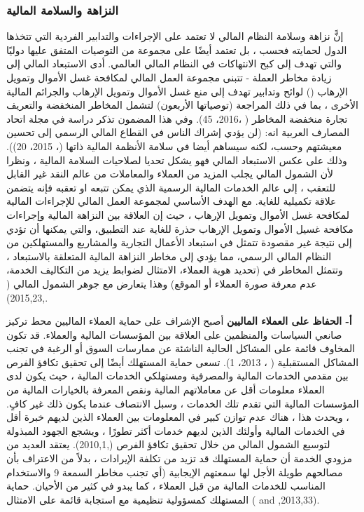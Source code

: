 \documentclass[10pt,a4paper]{report}
\begin{document}
\begin{doublespacing}
\subsubsection{النزاهة والسلامة المالية}
إنًّ نزاهة وسلامة النظام المالي لا تعتمد على الإجراءات والتدابير الفردية التي تتخذها الدول لحمايته فحسب ، بل تعتمد أيضًا على مجموعة من التوصيات المتفق عليها دوليًا والتي تهدف إلى كبح الانتهاكات في النظام المالي العالمي. أدى الاستبعاد المالي إلى زيادة مخاطر العملة - تتبنى مجموعة العمل المالي لمكافحة غسل الأموال وتمويل الإرهاب () لوائح وتدابير تهدف إلى منع غسل الأموال وتمويل الإرهاب والجرائم المالية الأخرى ، بما في ذلك المراجعة (توصياتها الأربعون) لتشمل المخاطر المنخفضة والتعريف تجارة منخفضة المخاطر ( ،2016، 45). 
وفي هذا المضمون تذكر دراسة في مجلة اتحاد المصارف العربية انه: (لن يؤدي إشراك الناس في القطاع المالي الرسمي إلى تحسين معيشتهم وحسب، لكنه سيساهم أيضا في سلامة الأنظمة المالية ذاتها (، 2015، 20)). وذلك على عكس الاستبعاد المالي فهو يشكل تحديا لصلاحيات السلامة المالية ، ونظرا لأن الشمول المالي يجلب المزيد من العملاء والمعاملات من عالم النقد غير القابل للتعقب ، إلى عالم الخدمات المالية الرسمية الذي يمكن تتبعه او تعقبه فإنه يتضمن علاقة تكميلية للغاية. مع الهدف الأساسي لمجموعة العمل المالي للإجراءات المالية لمكافحة غسل الأموال وتمويل الإرهاب ، حيث إن العلاقة بين النزاهة المالية وإجراءات مكافحة غسيل الأموال وتمويل الإرهاب حذرة للغاية عند التطبيق، والتي يمكنها أن تؤدي إلى نتيجة غير مقصودة تتمثل في استبعاد الأعمال التجارية والمشاريع والمستهلكين من النظام المالي الرسمي، مما يؤدي إلى مخاطر النزاهة المالية المتعلقة بالاستبعاد ، وتتمثل المخاطر في (تحديد هوية العملاء، الامتثال لضوابط يزيد من التكاليف الخدمة، عدم معرفة صورة العملاء أو الموقع) وهذا يتعارض مع جوهر الشمول المالي ( ,2015,23). 

\textbf{أ‌- الحفاظ على العملاء الماليين}  
أصبح الإشراف على حماية العملاء الماليين محط تركيز صانعي السياسات والمنظمين على العلاقة بين المؤسسات المالية والعملاء. قد تكون المخاوف قائمة على المشاكل الحالية الناشئة عن ممارسات السوق أو الرغبة في تجنب المشاكل المستقبلية ( ، 2013، 1). 
تسعى حماية المستهلك أيضًا إلى تحقيق تكافؤ الفرص بين مقدمي الخدمات المالية والمصرفية ومستهلكي الخدمات المالية ، حيث يكون لدى العملاء معلومات أقل عن معاملاتهم المالية ونقص المعرفة بالخيارات المالية من المؤسسات المالية التي تقدم تلك الخدمات ، وسبل الانتصاف عندما يكون ذلك غير كافٍ. ، ويحدث هذا ، هناك عدم توازن كبير في المعلومات بين العملاء الذين لديهم خبرة أقل في الخدمات المالية وأولئك الذين لديهم خدمات أكثر تطورًا ، ويشجع الجهود المبذولة لتوسيع الشمول المالي من خلال تحقيق تكافؤ الفرص (,2010,1). يعتقد العديد من مزودي الخدمة أن حماية المستهلك قد تزيد من تكلفة الإيرادات ، بدلاً من الاعتراف بأن مصالحهم طويلة الأجل لها سمعتهم الإيجابية (أي تجنب مخاطر السمعة 9 والاستخدام المناسب للخدمات المالية من قبل العملاء ، كما يبدو في كثير من الأحيان. حماية المستهلك كمسؤولية تنظيمية مع استجابة قائمة على الامتثال ( and  ,2013,33).


\end{doublespacing}
\end{document}
